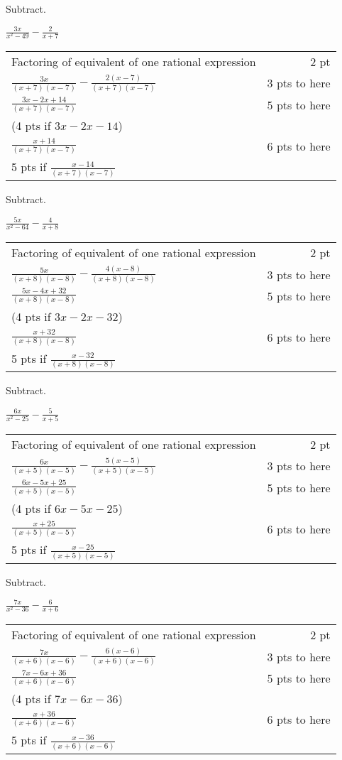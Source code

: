 {
	Subtract.\par
	$\displaystyle\frac{3x}{x^2-49}-\frac{2}{x+7}$
}
{
	\begin{tabular}{l r}
	Factoring of equivalent of one rational expression & 2 pt \\
	$\frac{3x}{(x+7)(x-7)} - \frac{2(x-7)}{(x+7)(x-7)}$ & 3 pts to here\\
	$\frac{3x-2x+14}{(x+7)(x-7)}$ & 5 pts to here \\
	(4 pts if $3x-2x-14$)\\
	$\frac{x+14}{(x+7)(x-7)}$ & 6 pts to here \\
	5 pts if $\frac{x-14}{(x+7)(x-7)}$
	\end{tabular}
}

{
	Subtract.\par
	$ \displaystyle\frac{5x}{x^2-64}-\frac{4}{x+8}$
}
{
	\begin{tabular}{l r}
	Factoring of equivalent of one rational expression & 2 pt \\
	$\frac{5x}{(x+8)(x-8)} - \frac{4(x-8)}{(x+8)(x-8)}$ & 3 pts to here\\
	$\frac{5x-4x+32}{(x+8)(x-8)}$ & 5 pts to here\\
	(4 pts if $3x-2x-32$)\\
	$\frac{x+32}{(x+8)(x-8)}$ & 6 pts to here \\
	5 pts if $\frac{x-32}{(x+8)(x-8)}$
	\end{tabular}
}

{
	Subtract.\par
	$ \displaystyle\frac{6x}{x^2-25}-\frac{5}{x+5}$
}
{
	\begin{tabular}{l r}
	Factoring of equivalent of one rational expression & 2 pt \\
	$\frac{6x}{(x+5)(x-5)} - \frac{5(x-5)}{(x+5)(x-5)}$ & 3 pts to here\\
	$\frac{6x-5x+25}{(x+5)(x-5)}$ & 5 pts to here \\
	(4 pts if $6x-5x-25$)\\
	$\frac{x+25}{(x+5)(x-5)}$ & 6 pts to here \\
	5 pts if $\frac{x-25}{(x+5)(x-5)}$
	\end{tabular}
}

{
	Subtract.\par
	$\displaystyle\frac{7x}{x^2-36}-\frac{6}{x+6}$
}
{
	\begin{tabular}{l r}
	Factoring of equivalent of one rational expression & 2 pt \\
	$\frac{7x}{(x+6)(x-6)} - \frac{6(x-6)}{(x+6)(x-6)}$ & 3 pts to here\\
	$\frac{7x-6x+36}{(x+6)(x-6)}$ & 5 pts to here \\
	(4 pts if $7x-6x-36$)\\
	$\frac{x+36}{(x+6)(x-6)}$ & 6 pts to here \\
	5 pts if $\frac{x-36}{(x+6)(x-6)}$
	\end{tabular}
}
